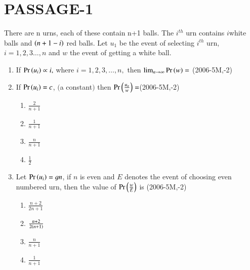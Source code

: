 \documentclass[journal,12pt,onecolumn,article]{IEEEtran}
\theoremstyle{remark}
\begin{document}
\section*{PASSAGE-1}
There are n urns, each of these contain n+1 balls. The $i^{th}$ urn contains $i$white balls and $\left(n+1-i\right)$ red balls. Let $u_1$ be the event of selecting $i^{th}$ urn, $i=1,2,3\dots,n$ and $w$ the event of getting a white ball.
\begin{enumerate}
	\item If $\Pr\left(u_i\right)\propto i,$ where $i=1,2,3,\dots,n,$ then $\lim_{n \to \infty} \Pr\left(w\right)=$ \hfill(2006-5M,-2)
		\begin{enumerate}
		\end{enumerate}
	\item If $\Pr\left(u_i\right)=c$, $($a constant$)$ then $\Pr\left(\frac{u_n}{w}\right)=$\hfill(2006-5M,-2)
		\begin{enumerate}
				\item $\frac{2}{n+1}$
				\item $\frac{1}{n+1}$
				\item $\frac{n}{n+1}$
				\item $\frac{1}{2}$
		\end{enumerate}
	\item Let $\Pr\left(u_i\right)=\frak{1}{n}$, if $n$ is even and $E$ denotes the event of choosing even numbered urn, then the value of $\Pr\left(\frac{w}{E}\right)$ is \hfill(2006-5M,-2)
		\begin{enumerate}
				\item $\frac{n+2}{2n+1}$
				\item $\frac{n+2}{2\left(n+1\right)}$
				\item $\frac{n}{n+1}$
				\item $\frac{1}{n+1}$
		\end{enumerate}

\end{enumerate}
\end{document}
